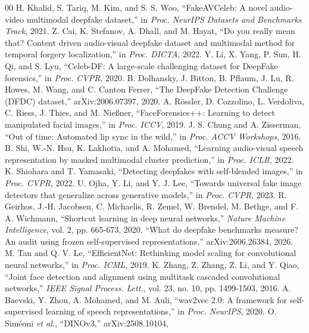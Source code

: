 \documentclass[conference]{IEEEtran}
\begin{document}
\begin{thebibliography}{00}
 H. Khalid, S. Tariq, M. Kim, and S. S. Woo,
``FakeAVCeleb: A novel audio-video multimodal deepfake dataset,'' in
\textit{Proc. NeurIPS Datasets and Benchmarks Track}, 2021.
 Z. Cai, K. Stefanov, A. Dhall, and M. Hayat, ``Do you really
mean that? Content driven audio-visual deepfake dataset and multimodal method
for temporal forgery localization,'' in \textit{Proc. DICTA}, 2022.
 Y. Li, X. Yang, P. Sun, H. Qi, and S. Lyu, ``Celeb-DF: A
large-scale challenging dataset for DeepFake forensics,'' in \textit{Proc.
CVPR}, 2020.
 B. Dolhansky, J. Bitton, B. Pflaum, J. Lu, R. Howes, M. Wang,
and C. Canton Ferrer, ``The DeepFake Detection Challenge (DFDC) dataset,''
arXiv:2006.07397, 2020.
 A. R\"ossler, D. Cozzolino, L. Verdoliva, C. Riess, J. Thies,
and M. Nie{\ss}ner, ``FaceForensics++: Learning to detect manipulated facial
images,'' in \textit{Proc. ICCV}, 2019.
 J. S. Chung and A. Zisserman, ``Out of time: Automated lip
sync in the wild,'' in \textit{Proc. ACCV Workshops}, 2016.
 B. Shi, W.-N. Hsu, K. Lakhotia, and A. Mohamed, ``Learning
audio-visual speech representation by masked multimodal cluster prediction,''
in \textit{Proc. ICLR}, 2022.
 K. Shiohara and T. Yamasaki, ``Detecting deepfakes with
self-blended images,'' in \textit{Proc. CVPR}, 2022.
 U. Ojha, Y. Li, and Y. J. Lee, ``Towards universal fake image
detectors that generalize across generative models,'' in \textit{Proc. CVPR},
2023.
 R. Geirhos, J.-H. Jacobsen, C. Michaelis, R. Zemel,
W. Brendel, M. Bethge, and F. A. Wichmann, ``Shortcut learning in deep neural
networks,'' \textit{Nature Machine Intelligence}, vol. 2, pp. 665-673, 2020.
 ``What do deepfake benchmarks measure? An audit using frozen
self-supervised representations,'' arXiv:2606.26384, 2026.
 M. Tan and Q. V. Le, ``EfficientNet: Rethinking model
scaling for convolutional neural networks,'' in \textit{Proc. ICML}, 2019.
 K. Zhang, Z. Zhang, Z. Li, and Y. Qiao, ``Joint face detection
and alignment using multitask cascaded convolutional networks,'' \textit{IEEE
Signal Process. Lett.}, vol. 23, no. 10, pp. 1499-1503, 2016.
 A. Baevski, Y. Zhou, A. Mohamed, and M. Auli, ``wav2vec 2.0:
A framework for self-supervised learning of speech representations,'' in
\textit{Proc. NeurIPS}, 2020.
 O. Sim\'eoni \textit{et al.}, ``DINOv3,'' arXiv:2508.10104,

\end{thebibliography}
\end{document}
